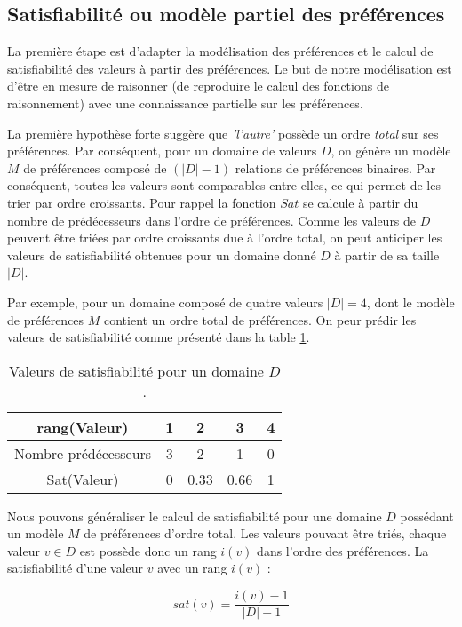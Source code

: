 \documentclass[runningheads,a4paper]{llncs}
\begin{document}
\subsection{Satisfiabilité ou modèle partiel des préférences}
\label{sec:sat}
La première étape est d'adapter la modélisation des préférences et le calcul de satisfiabilité des valeurs à partir des préférences. Le but de notre modélisation est d'être  en mesure de raisonner (de reproduire le calcul des fonctions de raisonnement) avec une connaissance partielle sur les préférences. 

La première hypothèse forte suggère que \emph{'l'autre'} possède un ordre \emph{total} sur ses préférences. Par conséquent, pour un domaine de valeurs $D$, on génère un modèle $M$ de préférences composé de $(|D| -1)$ relations de préférences binaires. Par conséquent, toutes les valeurs sont comparables entre elles, ce qui permet de les trier par ordre croissants.
Pour rappel la fonction $Sat$ se calcule à partir du nombre de prédécesseurs dans l'ordre de préférences. Comme les valeurs de $D$ peuvent être triées par ordre croissants due à l'ordre total, on peut anticiper les valeurs de satisfiabilité obtenues pour un domaine donné $D$ à partir de sa taille $|D|$.

Par exemple, pour un domaine composé de quatre valeurs $ |D|=4$, dont le modèle de préférences $M$ contient un ordre total de préférences. On peur prédir les valeurs de satisfiabilité comme présenté dans la table \ref{poss}.

\begin{table}
	\centering
	\begin{tabular}{ |c|c|c|c|c| }
		\hline				
		rang(Valeur) & 1 & 2 & 3 & 4 \\
		\hline
		Nombre prédécesseurs & 3 & 2 & 1& 0 \\
		\hline
		Sat(Valeur) & 0 & 0.33 & 0.66 &1 \\
		\hline
		
	\end{tabular}
	\caption{Valeurs de satisfiabilité pour un domaine $D$.}
	\label{poss}
\end{table}

Nous pouvons généraliser le calcul de satisfiabilité pour une domaine $D$ possédant un modèle $M$ de préférences d'ordre total. Les valeurs pouvant être triés, chaque valeur $v \in D$ est possède donc un rang $i(v)$ dans l'ordre des préférences. La satisfiabilité d'une valeur $v$ avec un rang $i(v)$ :

\begin{equation}
sat(v) = \frac{i(v)-1}{|D|-1}
\end{equation} 
\end{document}
